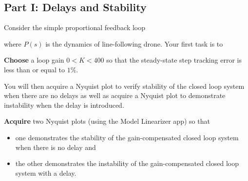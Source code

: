 \subsection{Part I: Delays and Stability}
Consider the simple proportional feedback loop
%
\begin{center}
\end{center}
where \(P(s)\) is the dynamics of line-following drone.
Your first task is to
%
\begin{deliverable}[label={del:lab5:p1:1}]
  \textbf{Choose} a loop gain \(0 < K < 400\) so that the steady-state step tracking error is less than or equal to \(1\%.\)
\end{deliverable}
%
You will then acquire a Nyquist plot to verify stability of the closed loop system when there are no delays as well as acquire a Nyquist plot to demonstrate instability when the delay is introduced.
%
\begin{deliverable}[label={del:lab5:p1:2}]
  \textbf{Acquire} two Nyquist plots (using the Model Linearizer app) so that
  \begin{itemize}
    \item{one demonstrates the stability of the gain-compensated closed loop system when there is no delay and}
    \item{the other demonstrates the instability of the gain-compensated closed loop system with a delay.}
  \end{itemize}
\end{deliverable}

